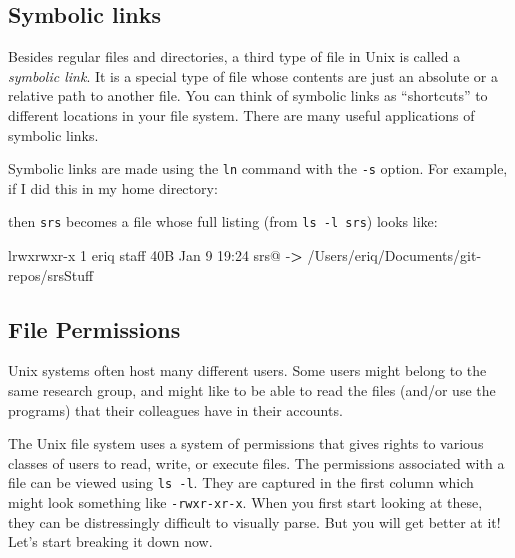 \documentclass[]{krantz}
\makeatletter
\newenvironment{Shaded}{\begin{snugshade}}{\end{snugshade}}
\newcommand{\ExtensionTok}[1]{#1}
\newcommand{\NormalTok}[1]{#1}
\newcommand{\OperatorTok}[1]{\textcolor[rgb]{0.43,0.43,0.43}{\textbf{#1}}}
\newenvironment{kframe}{%
\medskip{}
\setlength{\fboxsep}{.8em}
 \def\at@end@of@kframe{}%
 \ifinner\ifhmode%
  \def\at@end@of@kframe{\end{minipage}}%
  \begin{minipage}{\columnwidth}%
 \fi\fi%
 \def\FrameCommand##1{\hskip\@totalleftmargin \hskip-\fboxsep
 \colorbox{shadecolor}{##1}\hskip-\fboxsep
     \hskip-\linewidth \hskip-\@totalleftmargin \hskip\columnwidth}%
 \MakeFramed {\advance\hsize-\width
   \@totalleftmargin\z@ \linewidth\hsize
   \@setminipage}}%
 {\par\unskip\endMakeFramed%
 \at@end@of@kframe}
\renewenvironment{Shaded}{\begin{kframe}}{\end{kframe}}
\makeatother
\begin{document}
\hypertarget{symbolic-links}{%
\subsection{Symbolic links}\label{symbolic-links}}

Besides regular files and directories, a third type of file in Unix is called a
\emph{symbolic link}. It is a special type of file whose contents are just an
absolute or a relative path to another file. You can think of symbolic links
as ``shortcuts'' to different locations in your file system. There are many
useful applications of symbolic links.

Symbolic links are made using the \texttt{ln} command with the \texttt{-s} option. For example,
if I did this in my home directory:

\begin{Shaded}
\begin{Highlighting}[]
\NormalTok{[}\ExtensionTok{~}\NormalTok{]}\ExtensionTok{--%
\end{Highlighting}
\end{Shaded}

then \texttt{srs} becomes a file whose full listing (from \texttt{ls\ -l\ srs}) looks like:

\begin{Shaded}
\begin{Highlighting}[]
\ExtensionTok{lrwxrwxr-x}\NormalTok{  1 eriq  staff    40B Jan  9 19:24 srs@ -}\OperatorTok{>}\NormalTok{ /Users/eriq/Documents/git-repos/srsStuff}
\end{Highlighting}
\end{Shaded}

\hypertarget{file-permissions}{%
\subsection{File Permissions}\label{file-permissions}}

Unix systems often host many different users. Some users might belong to the
same research group, and might like to be able to read the files (and/or use
the programs) that their colleagues have in their accounts.

The Unix file system uses a system of permissions that gives rights to various
classes of users to read, write, or execute files. The permissions associated with
a file can be viewed using \texttt{ls\ -l}. They are captured in the first column which might
look something like \texttt{-rwxr-xr-x}. When you first start looking at these, they can
be distressingly difficult to visually parse. But you will get better at it! Let's
start breaking it down now.
\end{document}
